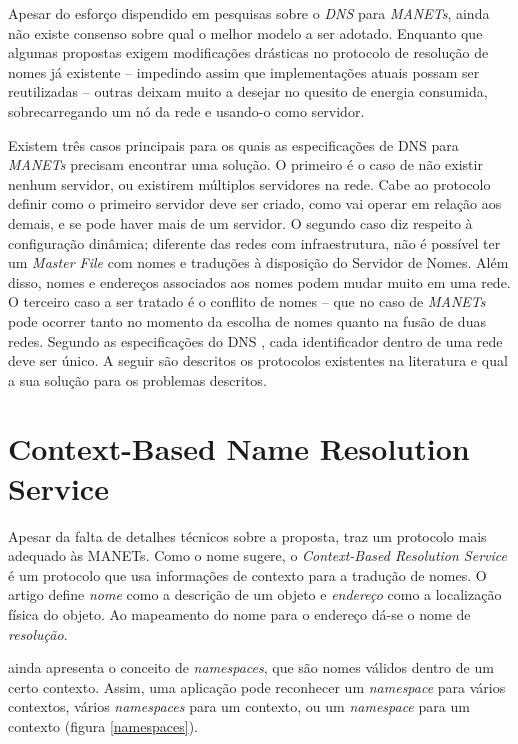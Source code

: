 
Apesar do esforço dispendido em pesquisas sobre o \textit{DNS} para \textit{MANETs},
ainda não existe consenso sobre qual o melhor modelo a ser 
adotado. Enquanto que algumas propostas exigem modificações drásticas no 
protocolo de resolução de nomes já existente -- impedindo assim que 
implementações atuais possam ser reutilizadas -- outras deixam muito a desejar 
no quesito de energia consumida, sobrecarregando um nó da rede e usando-o como
 servidor.

Existem três casos principais para os quais as especificações de DNS para 
\textit{MANETs} precisam encontrar uma solução. O primeiro é o caso de não existir 
nenhum servidor, ou existirem múltiplos servidores na rede. Cabe ao protocolo 
definir como o primeiro servidor deve ser criado, como vai operar em relação 
aos demais, e se pode haver mais de um servidor. O segundo caso diz respeito à 
configuração dinâmica; diferente das redes com infraestrutura, não é possível 
ter um \textit{Master File} com nomes e traduções à disposição do Servidor de 
Nomes. Além disso, nomes e endereços associados aos nomes podem mudar muito em 
uma rede. O terceiro caso a ser tratado é o conflito de nomes -- que no caso de 
\textit{MANETs} pode ocorrer tanto no momento da escolha de nomes quanto na fusão
 de duas redes. Segundo as especificações do DNS \cite{rfc1035}, cada 
 identificador dentro de uma rede deve ser único. A seguir são descritos os 
 protocolos existentes na literatura e qual a sua solução para os problemas descritos.

\section{Context-Based Name Resolution Service}
\label{context-based}

    Apesar da falta de detalhes técnicos sobre a proposta, \cite{context-dns}
    traz um protocolo mais adequado às MANETs. Como o nome
    sugere, o \textit{Context-Based Resolution Service} é um protocolo que usa
    informações de contexto para a tradução de nomes. O artigo define \emph{nome}
    como a descrição de um objeto e \emph{endereço} como a localização física do
    objeto. Ao mapeamento do nome para o endereço dá-se o nome de \emph{resolução}.
    
    \cite{context-dns} ainda apresenta o conceito de \textit{namespaces}, que são
    nomes válidos dentro de um certo contexto. Assim, uma aplicação pode reconhecer
    um \textit{namespace} para vários contextos, vários \textit{namespaces} para
    um contexto, ou um \textit{namespace} para um contexto (figura \ref{namespaces}).
    
